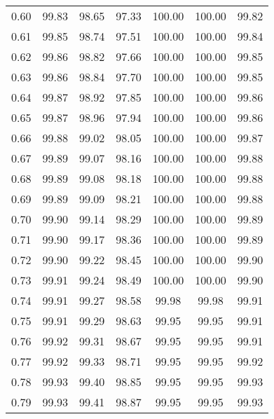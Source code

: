 \begin{tabular}{|c|c|c|c|c|c|c|}
      0.60 &     99.83 &     98.65 &      97.33 &  100.00 &     100.00 &         99.82 \\
      0.61 &     99.85 &     98.74 &      97.51 &  100.00 &     100.00 &         99.84 \\
      0.62 &     99.86 &     98.82 &      97.66 &  100.00 &     100.00 &         99.85 \\
      0.63 &     99.86 &     98.84 &      97.70 &  100.00 &     100.00 &         99.85 \\
      0.64 &     99.87 &     98.92 &      97.85 &  100.00 &     100.00 &         99.86 \\
      0.65 &     99.87 &     98.96 &      97.94 &  100.00 &     100.00 &         99.86 \\
      0.66 &     99.88 &     99.02 &      98.05 &  100.00 &     100.00 &         99.87 \\
      0.67 &     99.89 &     99.07 &      98.16 &  100.00 &     100.00 &         99.88 \\
      0.68 &     99.89 &     99.08 &      98.18 &  100.00 &     100.00 &         99.88 \\
      0.69 &     99.89 &     99.09 &      98.21 &  100.00 &     100.00 &         99.88 \\
      0.70 &     99.90 &     99.14 &      98.29 &  100.00 &     100.00 &         99.89 \\
      0.71 &     99.90 &     99.17 &      98.36 &  100.00 &     100.00 &         99.89 \\
      0.72 &     99.90 &     99.22 &      98.45 &  100.00 &     100.00 &         99.90 \\
      0.73 &     99.91 &     99.24 &      98.49 &  100.00 &     100.00 &         99.90 \\
      0.74 &     99.91 &     99.27 &      98.58 &   99.98 &      99.98 &         99.91 \\
      0.75 &     99.91 &     99.29 &      98.63 &   99.95 &      99.95 &         99.91 \\
      0.76 &     99.92 &     99.31 &      98.67 &   99.95 &      99.95 &         99.91 \\
      0.77 &     99.92 &     99.33 &      98.71 &   99.95 &      99.95 &         99.92 \\
      0.78 &     99.93 &     99.40 &      98.85 &   99.95 &      99.95 &         99.93 \\
      0.79 &     99.93 &     99.41 &      98.87 &   99.95 &      99.95 &         99.93 \\

\end{tabular}
